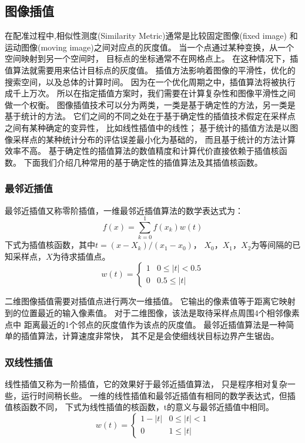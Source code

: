 \subsection{图像插值}%
在配准过程中,相似性测度(Similarity Metric)通常是比较固定图像(fixed image)
和运动图像(moving image)之间对应点的灰度值。
当一个点通过某种变换，从一个空间映射到另一个空间时，
目标点的坐标通常不在网格点上。
在这种情况下，插值算法就需要用来估计目标点的灰度值。
插值方法影响着图像的平滑性，优化的搜索空间，以及总体的计算时间。
因为在一个优化周期之中，插值算法将被执行成千上万次。
所以在指定插值方案时，我们需要在计算复杂性和图像平滑性之间做一个权衡。
图像插值技术可以分为两类，一类是基于确定性的方法，另一类是基于统计的方法。
它们之间的不同之处在于基于确定性的插值技术假定在采样点之间有某种确定的变异性，
比如线性插值中的线性；
基于统计的插值方法是以图像采样点的某种统计分布的评估误差最小化为基础的，
而且基于统计的方法计算效率不高。
基于确定性的插值算法的数值精度和计算代价直接依赖于插值核函数。
下面我们介绍几种常用的基于确定性的插值算法及其插值核函数。
\subsubsection{最邻近插值}
最邻近插值又称零阶插值，一维最邻近插值算法的数学表达式为：
\begin{equation}
  f(x)=\sum_{k=0}^1f(x_k)w(t)
\end{equation}
下式为插值核函数，其中$t=(x-X_k)/(x_1-x_0)$，
$X_0$，$X_1$，$X_2$为等间隔的已知采样点，$X$为待求插值点。
\begin{equation}
  w(t)=
  \begin{cases}
    1& 0\le\lvert t\rvert<0.5\\
    0& 0.5\le\lvert t\rvert
  \end{cases}
\end{equation}

二维图像插值需要对插值点进行两次一维插值。
它输出的像素值等于距离它映射到的位置最近的输入像素值。
对于二维图像，该法是取待采样点周围4个相邻像素点中
距离最近的1个邻点的灰度值作为该点的灰度值。
最邻近插值算法是一种简单的插值算法，计算速度非常快，
其不足是会使细线状目标边界产生锯齿。

\subsubsection{双线性插值}
线性插值又称为一阶插值，它的效果好于最邻近插值算法，
只是程序相对复杂一些，运行时间稍长些。
一维的线性插值和最邻近插值有相同的数学表达式，但插值核函数不同，
下式为线性插值的核函数，t的意义与最邻近插值中相同。
\begin{equation}
  w(t)=
  \begin{cases}
    1-\lvert t\rvert & 0\le\lvert t\rvert<1\\
    0& 1\le\lvert t\rvert
  \end{cases}
\end{equation}

